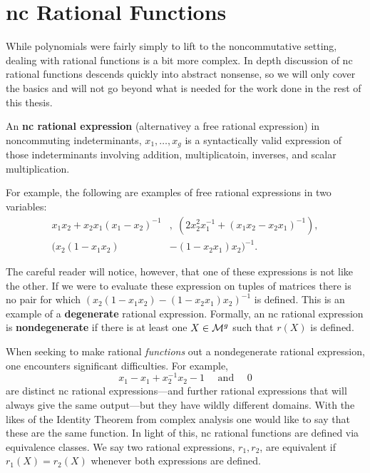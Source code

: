 \section{nc Rational Functions}%
\label{sec:ncrational}

While polynomials were fairly simply to lift to the noncommutative setting,
dealing with rational functions is a bit more complex. In depth discussion of nc
rational functions descends quickly into abstract nonsense, so we will only
cover the basics and will not go beyond what is needed for the work done in the
rest of this thesis.

\begin{definition}%
\label{def:ratexp}
  An \textbf{nc rational expression} (alternativey a free rational expression)
  in noncommuting indeterminants, \(x_1, \dots ,x_g\) is a syntactically valid
  expression of those indeterminants involving addition, multiplicatoin, inverses,
  and scalar multiplication.
\end{definition}

For example, the following are examples of free rational expressions in two
variables:
\begin{equation*}
\begin{split}
  x_1x_2+x_2x_1(x_1-x_2)^{-1} &,\; (2x_2^2x_1^{-1} +(x_1x_2-x_2x_1)^{-1}) ,\\
 (x_2(1-x_1x_2)&-(1-x_2x_1)x_2)^{-1}.
\end{split}
\end{equation*}

The careful reader will notice, however, that one of these expressions is not
like the other. If we were to evaluate these expression on tuples of matrices
there is no pair for which \((x_2(1-x_1x_2)-(1-x_2x_1)x_2)^{-1}\) is defined.
This is an example of a \textbf{degenerate} rational expression. Formally, an nc
rational expression is \textbf{nondegenerate} if there is at least one
\(X \in \mathcal{M}^{g} \) such that \(r(X)\) is defined.

When seeking to make rational \emph{functions} out a nondegenerate rational
expression, one encounters significant difficulties. For example,
\[
  x_1-x_1+x_2 ^{-1} x_2-1 \quad \textrm{ and } \quad 0
\]
are distinct nc rational expressions---and further rational expressions that will
always give the same output---but they have wildly different domains. With the
likes of the Identity Theorem from complex analysis one would like to say that
these are the same function. In light of this, nc rational functions are defined
via equivalence classes. We say two rational expressions, \(r_1,r_2\), are
equivalent if \(r_1(X) = r_2(X)\) whenever both expressions are defined.

